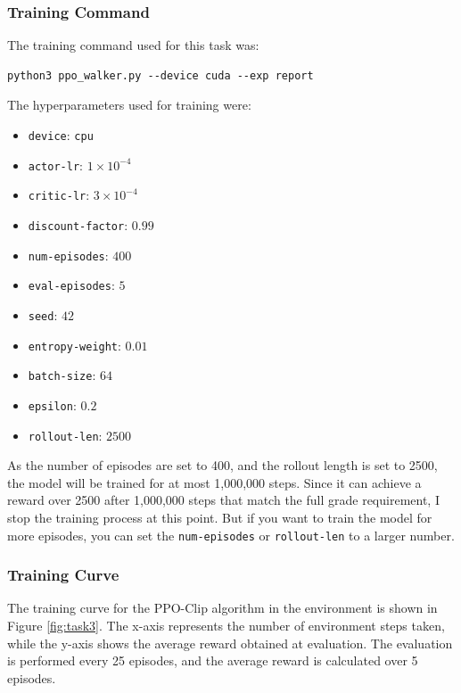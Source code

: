 \subsubsection{Training Command}

The training command used for this task was:
\begin{verbatim}
python3 ppo_walker.py --device cuda --exp report
\end{verbatim}

The hyperparameters used for training were:
\begin{itemize}
    \item \texttt{device}: \texttt{cpu}
    \item \texttt{actor-lr}: $1\times 10^{-4}$
    \item \texttt{critic-lr}: $3\times 10^{-4}$
    \item \texttt{discount-factor}: $0.99$
    \item \texttt{num-episodes}: $400$
    \item \texttt{eval-episodes}: $5$
    \item \texttt{seed}: $42$
    \item \texttt{entropy-weight}: $0.01$
    \item \texttt{batch-size}: $64$
    \item \texttt{epsilon}: $0.2$
    \item \texttt{rollout-len}: $2500$
\end{itemize}

As the number of episodes are set to 400, and the rollout length is set to 2500, the model will be trained for at most 1,000,000 steps.
Since it can achieve a reward over 2500 after 1,000,000 steps that match the full grade requirement, I stop the training process at this point.
But if you want to train the model for more episodes, you can set the \texttt{num-episodes} or \texttt{rollout-len} to a larger number.

\subsubsection{Training Curve}

The training curve for the PPO-Clip algorithm in the \walker environment is shown in Figure \ref{fig:task3}.
The x-axis represents the number of environment steps taken, while the y-axis shows the average reward obtained at evaluation.
The evaluation is performed every 25 episodes, and the average reward is calculated over 5 episodes.


